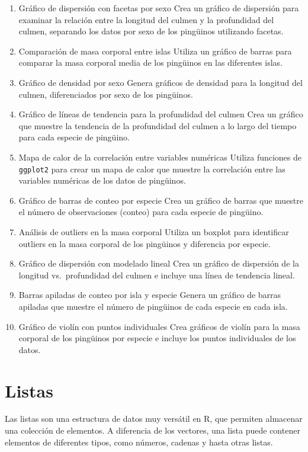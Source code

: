 \documentclass[
]{book}
\begin{document}
\begin{enumerate}
\def\labelenumi{\arabic{enumi}.}
\item
  Gráfico de dispersión con facetas por sexo
  Crea un gráfico de dispersión para examinar la relación entre la longitud del culmen y la profundidad del culmen, separando los datos por sexo de los pingüinos utilizando facetas.
\item
  Comparación de masa corporal entre islas
  Utiliza un gráfico de barras para comparar la masa corporal media de los pingüinos en las diferentes islas.
\item
  Gráfico de densidad por sexo
  Genera gráficos de densidad para la longitud del culmen, diferenciados por sexo de los pingüinos.
\item
  Gráfico de líneas de tendencia para la profundidad del culmen
  Crea un gráfico que muestre la tendencia de la profundidad del culmen a lo largo del tiempo para cada especie de pingüino.
\item
  Mapa de calor de la correlación entre variables numéricas
  Utiliza funciones de \texttt{ggplot2} para crear un mapa de calor que muestre la correlación entre las variables numéricas de los datos de pingüinos.
\item
  Gráfico de barras de conteo por especie
  Crea un gráfico de barras que muestre el número de observaciones (conteo) para cada especie de pingüino.
\item
  Análisis de outliers en la masa corporal
  Utiliza un boxplot para identificar outliers en la masa corporal de los pingüinos y diferencia por especie.
\item
  Gráfico de dispersión con modelado lineal
  Crea un gráfico de dispersión de la longitud vs.~profundidad del culmen e incluye una línea de tendencia lineal.
\item
  Barras apiladas de conteo por isla y especie
  Genera un gráfico de barras apiladas que muestre el número de pingüinos de cada especie en cada isla.
\item
  Gráfico de violín con puntos individuales
  Crea gráficos de violín para la masa corporal de los pingüinos por especie e incluye los puntos individuales de los datos.
\end{enumerate}

\hypertarget{Listas}{%
\chapter{Listas}\label{Listas}}

Las listas son una estructura de datos muy versátil en R, que permiten almacenar una colección de elementos. A diferencia de los vectores, una lista puede contener elementos de diferentes tipos, como números, cadenas y hasta otras listas.
\end{document}
